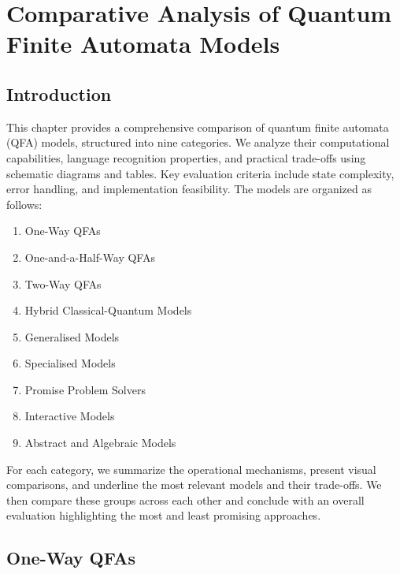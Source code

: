 
\chapter{Comparative Analysis of Quantum Finite Automata Models}
\label{chap:comparative-analysis}

\section{Introduction}
This chapter provides a comprehensive comparison of quantum finite automata (QFA) models, structured into nine categories. We analyze their computational capabilities, language recognition properties, and practical trade-offs using schematic diagrams and tables. Key evaluation criteria include state complexity, error handling, and implementation feasibility. The models are organized as follows:
\begin{enumerate}
    \item One-Way QFAs
    \item One-and-a-Half-Way QFAs
    \item Two-Way QFAs
    \item Hybrid Classical-Quantum Models
    \item Generalised Models
    \item Specialised Models
    \item Promise Problem Solvers
    \item Interactive Models
    \item Abstract and Algebraic Models
\end{enumerate}
For each category, we summarize the operational mechanisms, present visual comparisons, and underline the most relevant models and their trade-offs. We then compare these groups across each other and conclude with an overall evaluation highlighting the most and least promising approaches.

\section{One-Way QFAs}

